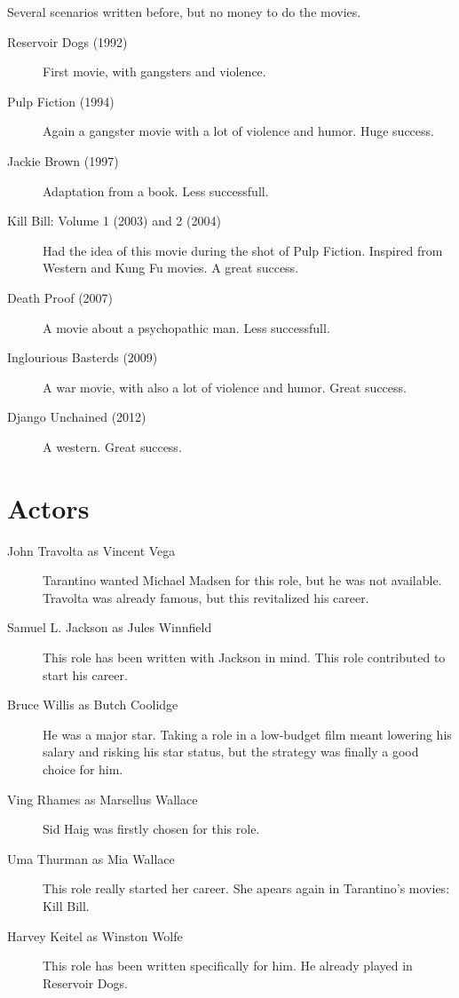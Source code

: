 \documentclass[a4paper,12pt]{article}
\begin{document}
Several scenarios written before, but no money to do the movies.

\begin{description}
    \item[Reservoir Dogs (1992)] First movie, with gangsters and violence.
    \item[Pulp Fiction (1994)] Again a gangster movie with a lot of violence and humor. Huge success.
    \item[Jackie Brown (1997)] Adaptation from a book. Less successfull.
    \item[Kill Bill: Volume 1 (2003) and 2 (2004)] Had the idea of this movie during the shot of Pulp Fiction. Inspired from Western and Kung Fu movies. A great success.
    \item[Death Proof (2007)] A movie about a psychopathic man. Less successfull.
    \item[Inglourious Basterds (2009)] A war movie, with also a lot of violence and humor. Great success.
    \item[Django Unchained (2012)] A western. Great success.
\end{description}

\section{Actors}

\begin{description}
    \item[John Travolta as Vincent Vega] Tarantino wanted Michael Madsen for this
role, but he was not available. Travolta was already famous, but this revitalized
his career.
    \item[Samuel L. Jackson as Jules Winnfield] This role has been written with
Jackson in mind. This role contributed to start his career.
    \item[Bruce Willis as Butch Coolidge] He was a major star. Taking a role in
a low-budget film meant lowering his salary and risking his star status, but the
strategy was finally a good choice for him.
    \item[Ving Rhames as Marsellus Wallace] Sid Haig was firstly chosen for this
role.
    \item[Uma Thurman as Mia Wallace] This role really started her career. She
apears again in Tarantino's movies: Kill Bill.
    \item[Harvey Keitel as Winston Wolfe] This role has been written specifically
for him. He already played in Reservoir Dogs.
\end{description}
\end{document}
